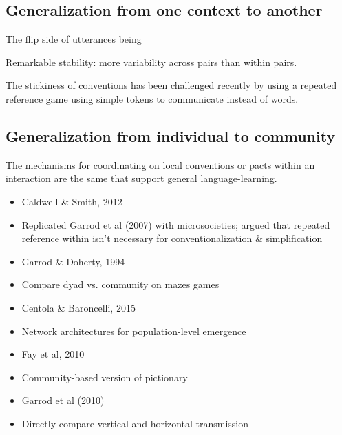 \documentclass[11pt, floatsintext, jou]{apa6}
\begin{document}
\subsection{Generalization from one context to another}

The flip side of utterances being 

Remarkable stability: more variability across pairs than within pairs. 


The stickiness of conventions has been challenged recently by  using a repeated reference game using simple tokens to communicate instead of words.

%
%

\subsection{Generalization from individual to community}

The mechanisms for coordinating on local conventions or pacts within an interaction are the same that support general language-learning. 

\begin{itemize}
\item Caldwell \& Smith, 2012
\item Replicated Garrod et al (2007) with microsocieties; argued that repeated reference within isn't necessary for conventionalization \& simplification
\item Garrod \& Doherty, 1994
\item Compare dyad vs. community on mazes games
\item Centola \& Baroncelli, 2015
\item Network architectures for population-level emergence
\item Fay et al, 2010 
\item Community-based version of pictionary
\item Garrod et al (2010)
\item Directly compare vertical and horizontal transmission
\end{itemize}
\end{document}
